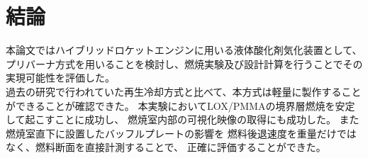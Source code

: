 \chapter{結論}
本論文ではハイブリッドロケットエンジンに用いる液体酸化剤気化装置として、
プリバーナ方式を用いることを検討し、燃焼実験及び設計計算を行うことでその実現可能性を評価した。
\\
過去の研究で行われていた再生冷却方式と比べて、本方式は軽量に製作することができることが確認できた。
本実験においてLOX/PMMAの境界層燃焼を安定して起こすことに成功し、
燃焼室内部の可視化映像の取得にも成功した。
また燃焼室直下に設置したバッフルプレートの影響を
燃料後退速度を重量だけではなく、燃料断面を直接計測することで、
正確に評価することができた。


